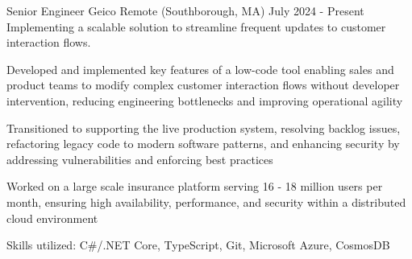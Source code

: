

\begin{cventries}

  \cventry
    {Senior Engineer} %
    {Geico} %
    {Remote (Southborough, MA)} %
    {July 2024 - Present} %
    {Implementing a scalable solution to streamline frequent updates to customer interaction flows.}
    {
      \begin{cvitems}
        \item {Developed and implemented key features of a low-code tool enabling sales and product teams to modify complex customer interaction flows without developer intervention, reducing engineering bottlenecks and improving operational agility}
        \item {Transitioned to supporting the live production system, resolving backlog issues, refactoring legacy code to modern software patterns, and enhancing security by addressing vulnerabilities and enforcing best practices}
        \item {Worked on a large scale insurance platform serving 16 - 18 million users per month, ensuring high availability, performance, and security within a distributed cloud environment}
        \item {Skills utilized: C\#/.NET Core, TypeScript, Git, Microsoft Azure, CosmosDB}
      \end{cvitems}
    }


\end{cventries}
